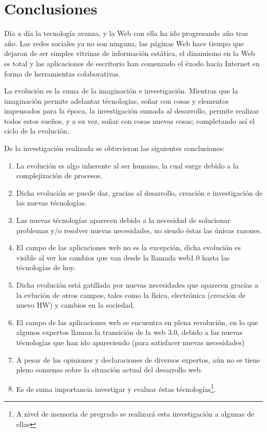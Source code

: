 \section{Conclusiones}

Día a día la tecnología avanza, y la Web con ella ha ido progresando año tras año. Las redes sociales ya no son ninguna, 
las páginas Web hace tiempo que dejaron de ser simples vitrinas de información estática, el dinamismo en la 
Web es total y las aplicaciones de escritorio han comenzado el éxodo hacia Internet en forma de herramientas 
colaborativas. 

La evolución es la suma de la imaginación e investigación. Mientras que la imaginación permite adelantar técnologías, soñar con cosas y 
elementos impensados para la época, la investigación sumada al desarrollo, permite realizar todos estos sueños, y a su vez, soñar con
cosas nuevas cosas; completando así el ciclo de la evolución.

De la investigación realizada se obtuvieron las siguientes conclusiones:
\begin{enumerate}
 \item La evolución es algo inherente al ser humano, la cual surge debido a la complejización de procesos.
 \item Dicha evolución se puede dar, gracias al desarrollo, creación e investigación de las nuevas técnologías.
 \item Las nuevas técnologías aparecen debido a la necesidad de solucionar problemas y/o resolver nuevas necesidades,
	no siendo éstas las únicas razones.
 \item El campo de las aplicaciones web no es la excepción, dicha evolución es visible al ver los cambios que van desde la
	llamada web1.0 hasta las técnologías de hoy. 
 \item Dicha evolución está gatillada por nuevas necesidades que aparecen gracias
	a la evlución de otros campos, tales como la física, electrónica (creación de nuevo HW) y cambios en la sociedad. 
 \item El campo de las aplicaciones web se encuentra en plena revolución, en lo que algunos expertos llaman la transición de la
	web 3.0, debido a las nuevas técnologías que han ido apareciendo (para satisfacer nuevas necesidades)
 \item A pesar de las opiniones y declaraciones de diversos expertos, aún no se tiene pleno consenso sobre la situación actual del
	desarrollo web.
 \item Es de suma importancia investigar y evaluar éstas técnologías\footnote{A nivel de memoria de pregrado se realizará esta 
	investigación a algunas de ellas}. 
\end{enumerate}



